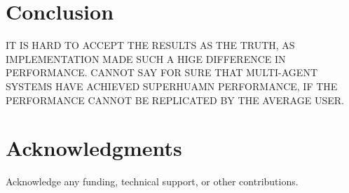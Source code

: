 \section{Conclusion}
\label{sec:conclusion}
IT IS HARD TO ACCEPT THE RESULTS AS THE TRUTH, AS IMPLEMENTATION MADE SUCH A HIGE DIFFERENCE IN PERFORMANCE. CANNOT SAY FOR SURE THAT MULTI-AGENT SYSTEMS HAVE ACHIEVED SUPERHUAMN PERFORMANCE, IF THE PERFORMANCE CANNOT BE REPLICATED BY THE AVERAGE USER. 

\section*{Acknowledgments}
Acknowledge any funding, technical support, or other contributions. 